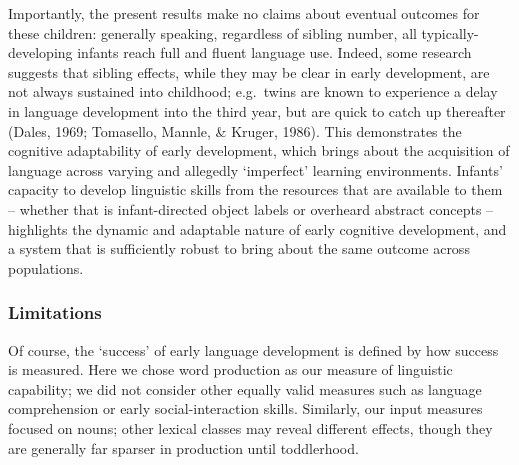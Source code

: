 \documentclass[
  english,
  man,floatsintext]{apa6}
\begin{document}
Importantly, the present results make no claims about eventual outcomes for these children: generally speaking, regardless of sibling number, all typically-developing infants reach full and fluent language use. Indeed, some research suggests that sibling effects, while they may be clear in early development, are not always sustained into childhood; e.g.~twins are known to experience a delay in language development into the third year, but are quick to catch up thereafter (Dales, 1969; Tomasello, Mannle, \& Kruger, 1986). This demonstrates the cognitive adaptability of early development, which brings about the acquisition of language across varying and allegedly `imperfect' learning environments. Infants' capacity to develop linguistic skills from the resources that are available to them -- whether that is infant-directed object labels or overheard abstract concepts -- highlights the dynamic and adaptable nature of early cognitive development, and a system that is sufficiently robust to bring about the same outcome across populations.

\hypertarget{limitations}{%
\subsubsection{Limitations}\label{limitations}}

Of course, the `success' of early language development is defined by how success is measured. Here we chose word production as our measure of linguistic capability; we did not consider other equally valid measures such as language comprehension or early social-interaction skills. Similarly, our input measures focused on nouns; other lexical classes may reveal different effects, though they are generally far sparser in production until toddlerhood.
\end{document}
